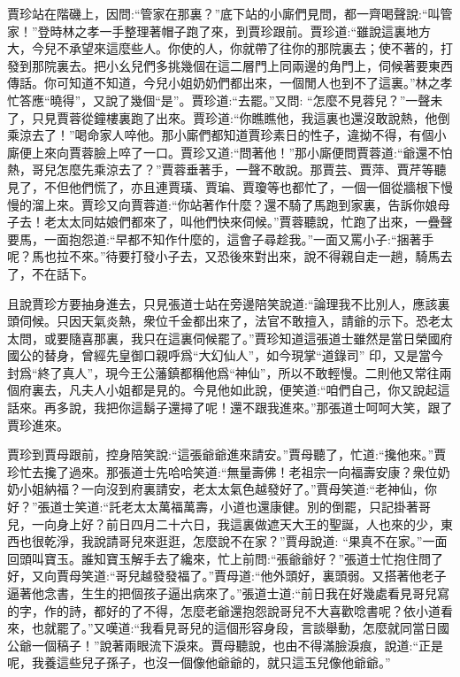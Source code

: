 \begin{parag}
    賈珍站在階磯上，因問:“管家在那裏？”底下站的小廝們見問，都一齊喝聲說:“叫管家！”登時林之孝一手整理著帽子跑了來，到賈珍跟前。賈珍道:“雖說這裏地方大，今兒不承望來這麼些人。你使的人，你就帶了往你的那院裏去；使不著的，打發到那院裏去。把小幺兒們多挑幾個在這二層門上同兩邊的角門上，伺候著要東西傳話。你可知道不知道，今兒小姐奶奶們都出來，一個閒人也到不了這裏。”林之孝忙答應“曉得”，又說了幾個“是”。賈珍道:“去罷。”又問: “怎麼不見蓉兒？”一聲未了，只見賈蓉從鐘樓裏跑了出來。賈珍道:“你瞧瞧他，我這裏也還沒敢說熱，他倒乘涼去了！”喝命家人啐他。那小廝們都知道賈珍素日的性子，違拗不得，有個小廝便上來向賈蓉臉上啐了一口。賈珍又道:“問著他！”那小廝便問賈蓉道:“爺還不怕熱，哥兒怎麼先乘涼去了？”賈蓉垂著手，一聲不敢說。那賈芸、賈萍、賈芹等聽見了，不但他們慌了，亦且連賈璜、賈㻞、賈瓊等也都忙了，一個一個從牆根下慢慢的溜上來。賈珍又向賈蓉道:“你站著作什麼？還不騎了馬跑到家裏，告訴你娘母子去！老太太同姑娘們都來了，叫他們快來伺候。”賈蓉聽說，忙跑了出來，一疊聲要馬，一面抱怨道:“早都不知作什麼的，這會子尋趁我。”一面又罵小子:“捆著手呢？馬也拉不來。”待要打發小子去，又恐後來對出來，說不得親自走一趟，騎馬去了，不在話下。
\end{parag}


\begin{parag}
    且說賈珍方要抽身進去，只見張道士站在旁邊陪笑說道:“論理我不比別人，應該裏頭伺候。只因天氣炎熱，衆位千金都出來了，法官不敢擅入，請爺的示下。恐老太太問，或要隨喜那裏，我只在這裏伺候罷了。”賈珍知道這張道士雖然是當日榮國府國公的替身，曾經先皇御口親呼爲“大幻仙人”，如今現掌“道錄司” 印，又是當今封爲“終了真人”，現今王公藩鎮都稱他爲“神仙”，所以不敢輕慢。二則他又常往兩個府裏去，凡夫人小姐都是見的。今見他如此說，便笑道:“咱們自己，你又說起這話來。再多說，我把你這鬍子還撏了呢！還不跟我進來。”那張道士呵呵大笑，跟了賈珍進來。
\end{parag}


\begin{parag}
    賈珍到賈母跟前，控身陪笑說:“這張爺爺進來請安。”賈母聽了，忙道:“攙他來。”賈珍忙去攙了過來。那張道士先哈哈笑道:“無量壽佛！老祖宗一向福壽安康？衆位奶奶小姐納福？一向沒到府裏請安，老太太氣色越發好了。”賈母笑道:“老神仙，你好？”張道士笑道:“託老太太萬福萬壽，小道也還康健。別的倒罷，只記掛著哥兒，一向身上好？前日四月二十六日，我這裏做遮天大王的聖誕，人也來的少，東西也很乾淨，我說請哥兒來逛逛，怎麼說不在家？”賈母說道: “果真不在家。”一面回頭叫寶玉。誰知寶玉解手去了纔來，忙上前問:“張爺爺好？”張道士忙抱住問了好，又向賈母笑道:“哥兒越發發福了。”賈母道:“他外頭好，裏頭弱。又搭著他老子逼著他念書，生生的把個孩子逼出病來了。”張道士道:“前日我在好幾處看見哥兒寫的字，作的詩，都好的了不得，怎麼老爺還抱怨說哥兒不大喜歡唸書呢？依小道看來，也就罷了。”又嘆道:“我看見哥兒的這個形容身段，言談舉動，怎麼就同當日國公爺一個稿子！”說著兩眼流下淚來。賈母聽說，也由不得滿臉淚痕，說道:“正是呢，我養這些兒子孫子，也沒一個像他爺爺的，就只這玉兒像他爺爺。”
\end{parag}


